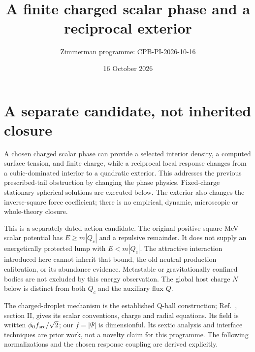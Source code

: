 \documentclass[11pt]{article}
\title{A finite charged scalar phase and a reciprocal exterior}
\author{Zimmerman programme: CPB-PI-2026-10-16}
\date{16 October 2026}
\begin{document}
\maketitle
\section{A separate candidate, not inherited closure}
A chosen charged scalar phase can provide a selected interior density,
a computed surface tension, and finite charge, while a reciprocal local
response changes from a cubic-dominated interior to a quadratic exterior.
This addresses the previous prescribed-tail obstruction by changing the
phase physics. Fixed-charge stationary spherical solutions are executed
below. The exterior also changes the inverse-square force coefficient;
there is no empirical, dynamic, microscopic or whole-theory closure.

This is a separately dated action candidate. The original positive-square
MeV scalar potential has $E\ge m|Q_c|$ and a repulsive remainder. It does
not supply an energetically protected lump with $E<m|Q_c|$. The attractive
interaction introduced here cannot inherit that bound, the old neutral
production calibration, or its abundance evidence. Metastable or
gravitationally confined bodies are not excluded by this energy observation.
The global host charge $N$ below is distinct from both $Q_c$ and the
auxiliary flux $Q$.

The charged-droplet mechanism is the established Q-ball construction;
Ref.~\cite{PIqball}, section II, gives its scalar conventions, charge and
radial equations. Its field is written $\phi_0 f_{\rm src}/\sqrt2$;
our $f=|\Psi|$ is dimensionful. Its sextic analysis and interface techniques
are prior work, not a novelty claim for this programme. The following
normalizations and the chosen response coupling are derived explicitly.
\end{document}
